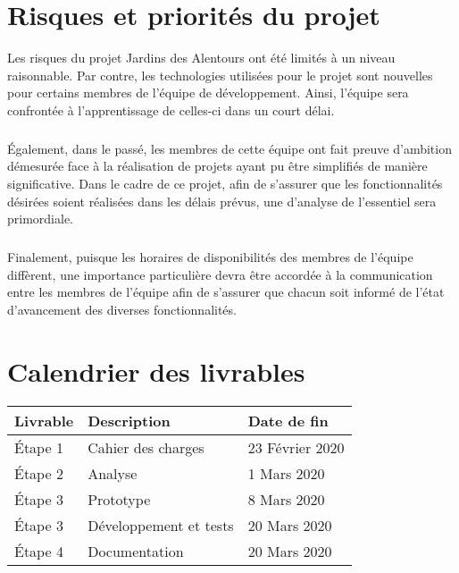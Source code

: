 \documentclass{scrreprt}
\def\projectname{Jardins des Alentours}
\begin{document}
\chapter{Risques et priorités du projet}

Les risques du projet \projectname{} ont été limités à un niveau raisonnable.
Par contre, les technologies utilisées pour le projet sont nouvelles pour certains
membres de l'équipe de développement. Ainsi, l'équipe sera confrontée à l'apprentissage
de celles-ci dans un court délai.

\paragraph{}
Également, dans le passé, les membres de cette équipe ont fait preuve d'ambition
démesurée face à la réalisation de projets ayant pu être simplifiés de manière significative.
Dans le cadre de ce projet, afin de s'assurer que les fonctionnalités désirées
soient réalisées dans les délais prévus, une d'analyse de l'essentiel sera
primordiale.

\paragraph{}
Finalement, puisque les horaires de disponibilités des membres de l'équipe diffèrent,
une importance particulière devra être accordée à la communication entre les membres
de l'équipe afin de s'assurer que chacun soit informé de l'état d'avancement des
diverses fonctionnalités.

\chapter{Calendrier des livrables}
\begin{tabular}{|l|p{9cm}|l|}
 \hline
 \bfseries Livrable & \bfseries Description  & \bfseries Date de fin \\
 \hline
 Étape 1            & Cahier des charges     & 23 Février 2020       \\
 \hline
 Étape 2            & Analyse                & 1 Mars 2020           \\
 \hline
 Étape 3            & Prototype              & 8 Mars 2020           \\
 \hline
 Étape 3            & Développement et tests & 20 Mars 2020          \\
 \hline
 Étape 4            & Documentation          & 20 Mars 2020          \\
 \hline
\end{tabular}
\end{document}
